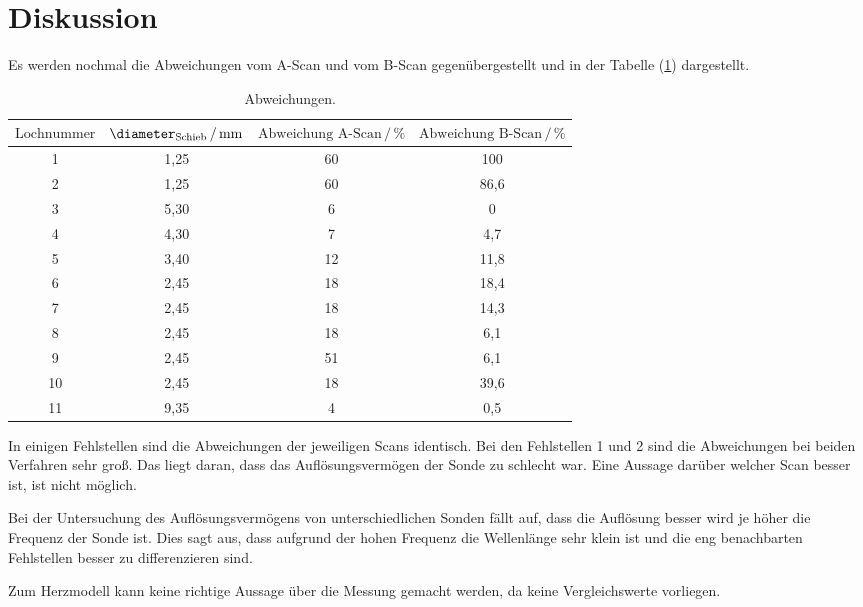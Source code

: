 \section{Diskussion}
Es werden nochmal die Abweichungen vom A-Scan und vom B-Scan
gegenübergestellt und in der Tabelle (\ref{tab:8}) dargestellt.
\begin{table}[H]
  \centering
  \caption{Abweichungen.}
  \label{tab:8}
  \begin{tabular}{c c c c}
    \toprule
    $\text{Lochnummer}$&
    $\diameter_{\text{Schieb}} \,/\, \si[per-mode=fraction]{\milli\meter}$&
    $\text{Abweichung A-Scan}  \,/\, \%$&
    $\text{Abweichung B-Scan} \,/\, \%$\\
    \midrule
    1   & 1,25 & 60  & 100  \\
    2   & 1,25 & 60  & 86,6 \\
    3   & 5,30 & 6   & 0    \\
    4   & 4,30 & 7   & 4,7  \\
    5   & 3,40 & 12  & 11,8 \\
    6   & 2,45 & 18  & 18,4 \\
    7   & 2,45 & 18  & 14,3 \\
    8   & 2,45 & 18  & 6,1  \\
    9   & 2,45 & 51  & 6,1  \\
    10  & 2,45 & 18  & 39,6 \\
    11  & 9,35 &  4  & 0,5  \\
  \bottomrule
  \end{tabular}
\end{table}
In einigen Fehlstellen sind die Abweichungen der jeweiligen Scans identisch. Bei den
Fehlstellen 1 und 2 sind die Abweichungen bei beiden Verfahren sehr groß. Das liegt
daran, dass das Auflösungsvermögen der Sonde zu schlecht war.
Eine Aussage darüber welcher Scan besser ist, ist nicht möglich.

Bei der Untersuchung des Auflösungsvermögens von unterschiedlichen Sonden fällt auf,
dass die Auflösung besser wird je höher die Frequenz der Sonde ist. Dies
sagt aus, dass aufgrund der hohen Frequenz die Wellenlänge sehr klein ist und
die eng benachbarten Fehlstellen besser zu differenzieren sind.

Zum Herzmodell kann keine richtige Aussage über
die Messung gemacht werden, da keine Vergleichswerte vorliegen.
